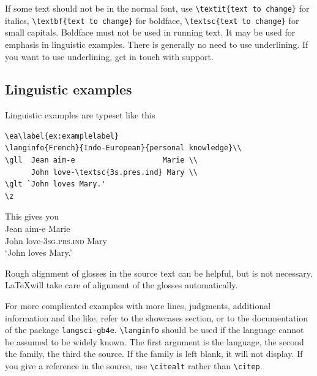 If some text should not be in the normal font, use 
\verb+\textit{text to change}+ for italics, 
\verb+\textbf{text to change}+ for boldface, 
\verb+\textsc{text to change}+ for small capitals. Boldface must not be used in running text. It may be used for emphasis in linguistic examples. 
There is generally no need to use underlining. If you want to use underlining, get in touch with support.

\subsection{Linguistic examples}
Linguistic examples are typeset like this

\begin{verbatim}
\ea\label{ex:examplelabel}
\langinfo{French}{Indo-European}{personal knowledge}\\
\gll  Jean aim-e                    Marie \\
      John love-\textsc{3s.pres.ind} Mary \\
\glt `John loves Mary.'    
\z
\end{verbatim}

\newcommand{\sg}{\textsc{sg}}
\newcommand{\prs}{\textsc{prs}}
\newcommand{\ind}{\textsc{ind}}
This gives you
\ea\label{ex:examplelabel}
\\
\gll  Jean aim-e Marie \\
      John love-{3\sg.\prs.\ind} Mary \\
\glt `John loves Mary.'    
\z

Rough alignment of glosses in the source text can be helpful, but is not necessary. \LaTeX will take care of alignment of the glosses automatically. 
% 

For more complicated examples with more lines, judgments, additional information and the like, refer to the showcases section, or to the documentation of the package \verb+langsci-gb4e+.
\verb+\langinfo+ should be used if the language cannot be assumed to be widely known. The first argument is the language, the second the family, the third the source. If the family is left blank, it will not display. If you give a reference in the source, use \verb+\citealt+ rather than \verb+\citep+.

